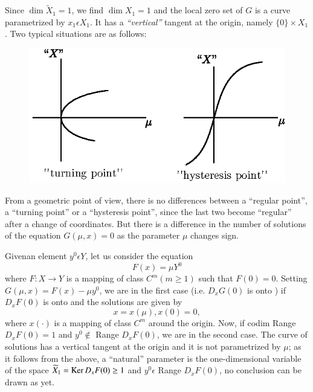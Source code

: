 Since $\dim \widetilde{X}_{1} = 1$, we find $\dim X_{1} = 1$ and the local zero set of $G$ is a curve parametrized by $x_{1} \epsilon X_{1}$. It has a {\em ``vertical''} tangent at the origin, namely $\{0\} \times X_{1}$. Two typical situations are as follows:
\begin{figure}[H]
\centering
\includegraphics{figure/fig76-3.2.eps}
\caption{}
\end{figure}


\begin{remark}\label{chap1-rem3.1}
From a geometric point of view, there is no differences between a ``regular point'', a ``turning point'' or a ``hysteresis point'', since the last two become ``regular'' after a change of coordinates. But there is a difference in the number of solutions of the equation $G(\mu, x) = 0$ as the parameter $\mu$ changes sign.
\end{remark}

\begin{example*}
Given\pageoriginale an element $y^{0} \epsilon Y$, let us consider the equation 
\begin{equation*}
F(x) = \mu Y^{0}\tag{3.4}\label{chap1-eq3.4}
\end{equation*}
where $F : X \to Y$ is a mapping of class $C^{m}(m \geq 1)$ such that $F(0) = 0$. Setting $G(\mu, x) = F(x) - \mu y^{0}$, we are in the first case (i.e. $D_{x}G(0)$ is onto ) if $D_{x}F(0)$ is onto and the solutions are given by
$$
x = x(\mu), x(0) = 0,
$$
where $x(\cdot)$ is a mapping of class $C^{m}$ around the origin. Now, if codim Range $D_{x}F(0) = 1$ and $y^{0} \notin$ Range $D_{x}F(0)$, we are in the second case. The curve of solutions has a vertical tangent at the origin and it is not parametrized by $\mu$; as it follows from the above, a ``natural'' parameter is the one-dimensional variable of the space $\widetilde{X}_{1} = \operatorname{Ker} D_{x}F(0) \geq 1$ and $y^{0} \epsilon$ Range $D_{x}F(0)$, no conclusion can be drawn as yet.
\end{example*}

